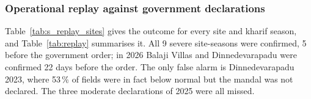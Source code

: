 \documentclass[11pt,a4paper,oneside]{article}
\newcommand{\mf}{macro-F1}
\begin{document}
\begin{table}[H]
\centering
\caption{Satellite module: 15-day crop-condition forecast by field type and season (test 2025--2026, \mf; last column onset ROC-AUC of version 3).}
\label{tab:s_subsets}
\footnotesize
{}
\end{table}


\subsubsection{Operational replay against government declarations}
Table~\ref{tab:s_replay_sites} gives the outcome for every site and kharif season, and Table~\ref{tab:replay} summarises it. All 9 severe site-seasons were confirmed, 5 before the government order; in 2026 Balaji Villas and Dinnedevarapadu were confirmed 22 days before the order. The only false alarm is Dinnedevarapadu 2023, where 53\,\% of fields were in fact below normal but the mandal was not declared. The three moderate declarations of 2025 were all missed.
\end{document}
